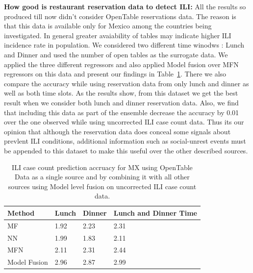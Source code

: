 

{\noindent \textbf{How good is restaurant reservation data to detect ILI: }} All the results so produced till now
didn't consider OpenTable reservations data. The reason is that this data is available only for Mexico among the 
countries being investigated. In general greater avaiability of tables may indicate higher ILI incidence rate in population.
We considered two different time winodws : Lunch and Dinner and used the number of open tables as the surrogate data.
We applied the three different regressors and also applied Model fusion over MFN regressors on this data and present 
our findings in Table~\ref{tb:opentable}. There we also compare the accuracy while using reservation 
data from only lunch and dinner as well as both time slots. As the results show, from this dataset we get the best 
result when we consider both lunch and dinner reservation data. Also, we find that including this data as part of the
ensemble decrease the accuracy by 0.01 over the one observed while using uncorrected ILI case count data. Thus its 
our opinion that although the reservation data does conceal some signals about prevlent ILI conditions, additional
information such as social-unrest events must be appended to this dataset to make this useful over the 
other described sources.

\begin{table}[tb!]
\centering
\caption{\label{tb:opentable}  ILI case count prediction accruacy for MX using OpenTable Data as a single source and
by combining it with all other sources using Model level fusion on uncorrected ILI case count data.}
\vspace{1em}
\begin{tabular}{|p{1.5cm}|*{2}{l|}p{2cm}|}
\hline
Method& Lunch & Dinner & Lunch and Dinner Time \\
\hline \hline
MF   & 1.92 & 2.23 & 2.31 \\
NN   & 1.99 & 1.83 & 2.11 \\
MFN  & 2.11 & 2.31 & 2.44 \\
Model Fusion & 2.96 & 2.87 & 2.99 \\
\hline
\end{tabular}
\end{table}

